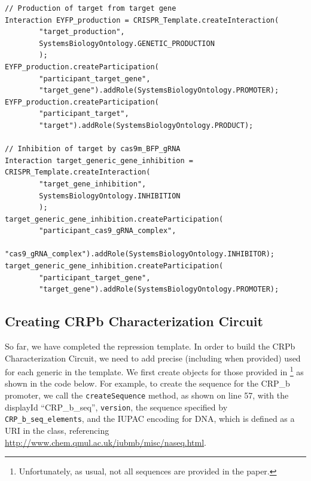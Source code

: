 \vspace{\abovedisplayskip}
\begin{minipage}{0.95\textwidth}%
\begin{lstlisting}
// Production of target from target gene
Interaction EYFP_production = CRISPR_Template.createInteraction(
        "target_production", 
        SystemsBiologyOntology.GENETIC_PRODUCTION
        );
EYFP_production.createParticipation(
        "participant_target_gene", 
        "target_gene").addRole(SystemsBiologyOntology.PROMOTER);
EYFP_production.createParticipation(
        "participant_target", 
        "target").addRole(SystemsBiologyOntology.PRODUCT);
	
// Inhibition of target by cas9m_BFP_gRNA 
Interaction target_generic_gene_inhibition = CRISPR_Template.createInteraction(
        "target_gene_inhibition", 
        SystemsBiologyOntology.INHIBITION
        );
target_generic_gene_inhibition.createParticipation(
        "participant_cas9_gRNA_complex", 
        "cas9_gRNA_complex").addRole(SystemsBiologyOntology.INHIBITOR);
target_generic_gene_inhibition.createParticipation(
        "participant_target_gene", 
        "target_gene").addRole(SystemsBiologyOntology.PROMOTER);
\end{lstlisting}
\end{minipage}

\subsection*{Creating CRPb Characterization Circuit}
So far, we have completed the repression template. In order to build the CRPb Characterization Circuit, we need to add precise (including  when provided)  used for each generic  in the template. We first create  objects for those provided in \cite{kiani2014crispr}\footnote{Unfortunately, as usual, not all sequences are provided in the paper.} as shown in the code below. For example, to create the sequence for the CRP\_b promoter, we call the \lstinline+createSequence+ method, as shown on line 57, with the displayId ``CRP\_b\_seq'', \lstinline+version+, the sequence specified by \lstinline+CRP_b_seq_elements+, and the IUPAC encoding for DNA, which is defined as a URI in the  class, referencing \url{http://www.chem.qmul.ac.uk/iubmb/misc/naseq.html}.

